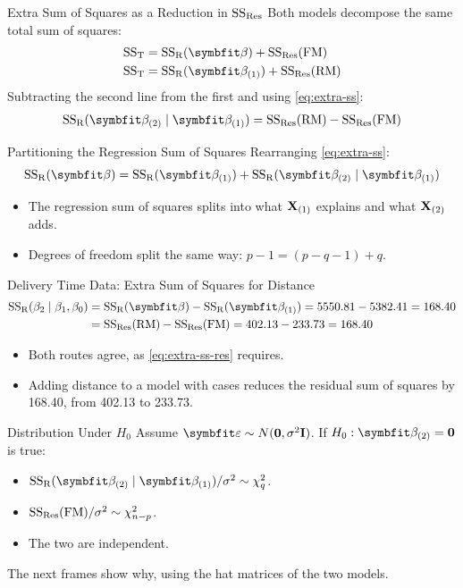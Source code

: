 \begin{frame}{Extra Sum of Squares as a Reduction in $\mathrm{SS}_{\mathrm{Res}}$}
    Both models decompose the same total sum of squares:
    \begin{align*}
        \SST &= \SSR(\bbeta) + \SSRes(\FM) \\
        \SST &= \SSR(\bbeta_{(1)}) + \SSRes(\RM)
    \end{align*}
    Subtracting the second line from the first and using \eqref{eq:extra-ss}:
    \begin{align}
        \SSR(\bbeta_{(2)}\mid\bbeta_{(1)}) = \SSRes(\RM) - \SSRes(\FM)
        \label{eq:extra-ss-res}
    \end{align}
\end{frame}


\begin{frame}{Partitioning the Regression Sum of Squares}
    Rearranging \eqref{eq:extra-ss}:
    \[
    \SSR(\bbeta) = \SSR(\bbeta_{(1)}) + \SSR(\bbeta_{(2)}\mid\bbeta_{(1)})
    \]
    \begin{itemize}
        \item The regression sum of squares splits into what $\mathbf{X}_{(1)}$ explains and what $\mathbf{X}_{(2)}$ adds.
        \item Degrees of freedom split the same way: $p-1=(p-q-1)+q$.
    \end{itemize}
\end{frame}


\begin{frame}{Delivery Time Data: Extra Sum of Squares for Distance}
    \begin{align*}
        \SSR(\beta_2\mid\beta_1,\beta_0) &= \SSR(\bbeta) - \SSR(\bbeta_{(1)}) = 5550.81 - 5382.41 = 168.40 \\
        &= \SSRes(\RM) - \SSRes(\FM) = 402.13 - 233.73 = 168.40
    \end{align*}
    \begin{itemize}
        \item Both routes agree, as \eqref{eq:extra-ss-res} requires.
        \item Adding distance to a model with cases reduces the residual sum of squares by 168.40, from 402.13 to 233.73.
    \end{itemize}
\end{frame}


\begin{frame}{Distribution Under $H_0$}
    Assume $\bvarepsilon\sim N(\bzero,\sigma^2\bI)$. If $H_0:\bbeta_{(2)}=\bzero$ is true:
    \begin{itemize}
        \item $\SSR(\bbeta_{(2)}\mid\bbeta_{(1)})/\sigma^2\sim\chi^2_q$.
        \item $\mathrm{SS}_{\mathrm{Res}}(\mathrm{FM})/\sigma^2\sim\chi^2_{n-p}$.
        \item The two are independent.
    \end{itemize}
    \svspace{0.5em}
    The next frames show why, using the hat matrices of the two models.
\end{frame}


